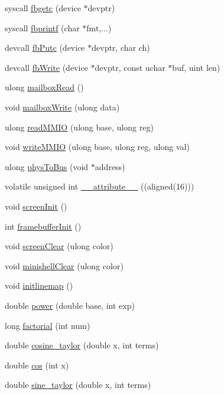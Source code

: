 \begin{DoxyCompactItemize}
\item 
syscall \hyperlink{group__framebuffer_ga58dd5ca5672b2a60f6fd7d84b21604fa}{fbgetc} (device $\ast$devptr)
\item 
syscall \hyperlink{group__framebuffer_gae27b27fde448b226b5fdb3b09ba6a6cf}{fbprintf} (char $\ast$fmt,...)
\item 
devcall \hyperlink{group__framebuffer_ga275598c76328d67dd24528da8f6b82a9}{fb\-Putc} (device $\ast$devptr, char ch)
\item 
devcall \hyperlink{group__framebuffer_ga2986864462be3ca8c70bd2da1faf8870}{fb\-Write} (device $\ast$devptr, const uchar $\ast$buf, uint len)
\item 
ulong \hyperlink{group__framebuffer_ga71d1bd833737d965d0223b5da02b6311}{mailbox\-Read} ()
\item 
void \hyperlink{group__framebuffer_ga4f8108da950b74ecf40e586187d5fa6e}{mailbox\-Write} (ulong data)
\item 
ulong \hyperlink{group__framebuffer_ga066eacc612c8bedce15eae1c33b004e5}{read\-M\-M\-I\-O} (ulong base, ulong reg)
\item 
void \hyperlink{group__framebuffer_ga8a59650d2f1bccd558d8e27ccb10f859}{write\-M\-M\-I\-O} (ulong base, ulong reg, ulong val)
\item 
ulong \hyperlink{group__framebuffer_gaec48109921b4cac283b9a8b09e8d3b4d}{phys\-To\-Bus} (void $\ast$address)
\item 
volatile unsigned int \hyperlink{group__framebuffer_ga8cc6c2c5dacb126c55b0c3aa9dd0e552}{\-\_\-\-\_\-attribute\-\_\-\-\_\-} ((aligned(16)))
\item 
void \hyperlink{group__framebuffer_gad185f05b60d4c37caf680a0bc3965130}{screen\-Init} ()
\item 
int \hyperlink{group__framebuffer_ga56ef48c620ce51763b69d07f912aa73b}{framebuffer\-Init} ()
\item 
void \hyperlink{group__framebuffer_gae53dd11cfa34d8495673673e60de3230}{screen\-Clear} (ulong color)
\item 
void \hyperlink{group__framebuffer_ga6b5b2d4cd5bc3ff9d509d3da923c9a38}{minishell\-Clear} (ulong color)
\item 
void \hyperlink{group__framebuffer_ga09da65be8be722fc8e0a30ecfa616818}{initlinemap} ()
\item 
double \hyperlink{group__framebuffer_ga06d83b3a8c4e7de105f0cbec05156ca8}{power} (double base, int exp)
\item 
long \hyperlink{group__framebuffer_gaace690b4b57f656869ad150be9b8527b}{factorial} (int num)
\item 
double \hyperlink{group__framebuffer_ga8f29a8a49cb9e546d0593b65f839f27a}{cosine\-\_\-taylor} (double x, int terms)
\item 
double \hyperlink{group__framebuffer_gaea037da8bd8165c16730fb1f23b6df03}{cos} (int x)
\item 
double \hyperlink{group__framebuffer_gad72a63046aee1a31203e50b812f03bd7}{sine\-\_\-taylor} (double x, int terms)
\end{DoxyCompactItemize}


